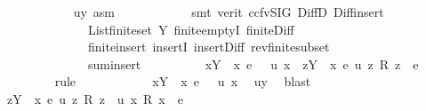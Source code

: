 \begin{isabellebody}
\ \ \ \ \ \ \ \ \ \ \isamarkupfalse%
\ uy\ asm\isanewline
\ \ \ \ \ \ \ \ \ \ \isamarkupfalse%
\ {\isacharparenleft}{\kern0pt}smt\ {\isacharparenleft}{\kern0pt}verit{\isacharcomma}{\kern0pt}\ ccfv{\isacharunderscore}{\kern0pt}SIG{\isacharparenright}{\kern0pt}\ DiffD{}\ Diff{\isacharunderscore}{\kern0pt}insert\isanewline
\ \ \ \ \ \ \ \ \ \ \ \ \ \ List{\isachardot}{\kern0pt}finite{\isacharunderscore}{\kern0pt}set\ Y{\isacharparenleft}{\kern0pt}{}{\isacharparenright}{\kern0pt}\ finite{\isachardot}{\kern0pt}emptyI\ finite{\isacharunderscore}{\kern0pt}Diff{}\isanewline
\ \ \ \ \ \ \ \ \ \ \ \ \ \ finite{\isacharunderscore}{\kern0pt}insert\ insertI{}\ insert{\isacharunderscore}{\kern0pt}Diff\ rev{\isacharunderscore}{\kern0pt}finite{\isacharunderscore}{\kern0pt}subset\isanewline
\ \ \ \ \ \ \ \ \ \ \ \ \ \ sum{\isachardot}{\kern0pt}insert{\isacharparenright}{\kern0pt}\isanewline
\ \ \ \ \ \ \ \ \isamarkupfalse%
\ {}{\isacharcolon}{\kern0pt}{\isachardoublequoteopen}{\isacharparenleft}{\kern0pt}{\isasymforall}x{\isasymin}Y\ {\isacharminus}{\kern0pt}\ {\isacharbraceleft}{\kern0pt}x{\isacharcomma}{\kern0pt}\ e{\isacharbraceright}{\kern0pt}{\isachardot}{\kern0pt}\ {}\ {\isasymle}\ u\ x{\isacharparenright}{\kern0pt}\ {\isasymand}\ {\isacharparenleft}{\kern0pt}{\isasymSum}z{\isasymin}Y\ {\isacharminus}{\kern0pt}\ {\isacharbraceleft}{\kern0pt}x{\isacharcomma}{\kern0pt}\ e{\isacharbraceright}{\kern0pt}{\isachardot}{\kern0pt}\ u\ z\ {\isacharasterisk}{\kern0pt}\isactrlsub R\ z{\isacharparenright}{\kern0pt}\ {\isacharequal}{\kern0pt}\ e{\isachardoublequoteclose}\isanewline
\ \ \ \ \ \ \ \ \isamarkupfalse%
{\isacharparenleft}{\kern0pt}rule{\isacharparenright}{\kern0pt}\isanewline
\ \ \ \ \ \ \ \ \ \ \isamarkupfalse%
\ {\isachardoublequoteopen}{\isasymforall}x{\isasymin}Y\ {\isacharminus}{\kern0pt}\ {\isacharbraceleft}{\kern0pt}x{\isacharcomma}{\kern0pt}\ e{\isacharbraceright}{\kern0pt}{\isachardot}{\kern0pt}\ {}\ {\isasymle}\ u\ x{\isachardoublequoteclose}\ \isamarkupfalse%
\ uy\ \isamarkupfalse%
\ blast\isanewline
\ \ \ \ \ \ \ \ \ \ \isamarkupfalse%
\ {\isachardoublequoteopen}{\isacharparenleft}{\kern0pt}{\isasymSum}z{\isasymin}Y\ {\isacharminus}{\kern0pt}\ {\isacharbraceleft}{\kern0pt}x{\isacharcomma}{\kern0pt}\ e{\isacharbraceright}{\kern0pt}{\isachardot}{\kern0pt}\ u\ z\ {\isacharasterisk}{\kern0pt}\isactrlsub R\ z{\isacharparenright}{\kern0pt}\ {\isacharplus}{\kern0pt}\ {\isacharparenleft}{\kern0pt}u\ x\ {\isacharasterisk}{\kern0pt}\isactrlsub R\ x{\isacharparenright}{\kern0pt}\ {\isacharequal}{\kern0pt}\ e{\isachardoublequoteclose}\ \isanewline

\end{isabellebody}
